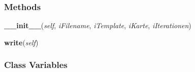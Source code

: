 
  \subsubsection{Methods}

    \label{OutputWrite:OutputWriter:__init__}

    \vspace{0.5ex}

\hspace{.8\funcindent}\begin{boxedminipage}{\funcwidth}

    \raggedright \textbf{\_\_init\_\_}(\textit{self}, \textit{iFilename}, \textit{iTemplate}, \textit{iKarte}, \textit{iIterationen})

\setlength{\parskip}{2ex}
\setlength{\parskip}{1ex}
    \end{boxedminipage}

    \label{OutputWrite:OutputWriter:write}

    \vspace{0.5ex}

\hspace{.8\funcindent}\begin{boxedminipage}{\funcwidth}

    \raggedright \textbf{write}(\textit{self})

\setlength{\parskip}{2ex}
\setlength{\parskip}{1ex}
    \end{boxedminipage}



  \subsubsection{Class Variables}

